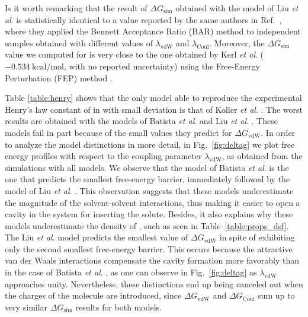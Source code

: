 \documentclass[3p,twocolumn]{elsarticle}
\begin{document}
Is it worth remarking that the result of $\Delta G_\text{sim}$ obtained with the model of Liu \textit{et al}. \cite{Liu_2014} is statistically identical to a value reported by the same authors in Ref.~, where they applied the Bennett Acceptance Ratio (BAR) method \cite{Bennett_1976} to independent samples obtained with different values of $\lambda_\text{vdW}$ and $\lambda_\text{Coul}$.
Moreover, the $\Delta G_\text{sim}$ value we computed for \ce{[emim][NTf_2]} is very close to the one obtained by Kerl \textit{et al}. \cite{Kerl__2017} ($-0.534 ~\mathrm{kcal/mol}$, with no reported uncertainty) using the Free-Energy Perturbation (FEP) method \cite{Zwanzig_1954}.

Table \ref{table:henry} shows that the only model able to reproduce the experimental Henry's law constant of  in \ce{[emim][B(CN)_4]} with small deviation is that of Koller \textit{et al}. \cite{Koller_2012}.
The worst results are obtained with the models of Batista \textit{et al}. \cite{Batista_2015} and Liu \textit{et al}. \cite{Liu_2014}.
These models fail in part because of the small values they predict for $\Delta G_\text{vdW}$.
In order to analyze the model distinctions in more detail, in Fig.~\ref{fig:deltag} we plot free energy profiles with respect to the coupling parameter $\lambda_\text{vdW}$, as obtained from the simulations with all \ce{[emim][B(CN)_4]} models.
We observe that the model of Batista \textit{et al}. \cite{Batista_2015} is the one that predicts the smallest free-energy barrier, immediately followed by the model of Liu \textit{et al}. \cite{Liu_2014}.
This observation suggests that these models underestimate the magnitude of the solvent-solvent interactions, thus making it easier to open a cavity in the system for inserting the solute.
Besides, it also explains why these models underestimate the density of \ce{[emim][B(CN)_4]}, such as seen in Table~\ref{table:props_dsf}.
The Liu \textit{et al}. \cite{Liu_2014} model predicts the smallest value of $\Delta G_\text{vdW}$ in spite of exhibiting only the second smallest free-energy barrier.
This occurs because the attractive van der Waals interactions compensate the cavity formation more favorably than in the case of Batista \textit{et al}. \cite{Batista_2015}, as one can observe in Fig.~\ref{fig:deltag} as $\lambda_\text{vdW}$ approaches unity.
Nevertheless, these distinctions end up being canceled out when the charges of the  molecule are introduced, since $\Delta G_\text{vdW}$ and $\Delta G_\text{Coul}$ sum up to very similar $\Delta G_\text{sim}$ results for both models.
\end{document}
